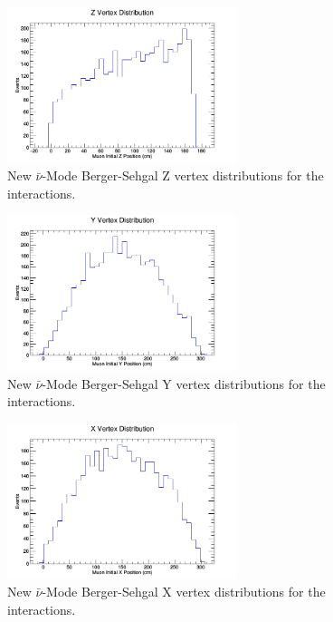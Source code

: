 \documentclass[11pt]{article}
\begin{document}
\begin{figure}[H]
\centering
\includegraphics[width=0.6\textwidth]{NewANMBergerSehgalImages/2-ZVertexDistributionANMBS.png}
\caption{New $\bar{\nu}$-Mode Berger-Sehgal Z vertex distributions for the interactions.}
\end{figure}

\begin{figure}[H]
\centering
\includegraphics[width=0.6\textwidth]{NewANMBergerSehgalImages/3-YVertexDistributionANMBS.png}
\caption{New $\bar{\nu}$-Mode Berger-Sehgal Y vertex distributions for the interactions.}
\end{figure}

\begin{figure}[H]
\centering
\includegraphics[width=0.6\textwidth]{NewANMBergerSehgalImages/4-XVertexDistributionANMBS.png}
\caption{New $\bar{\nu}$-Mode Berger-Sehgal X vertex distributions for the interactions.}
\end{figure}
\end{document}
